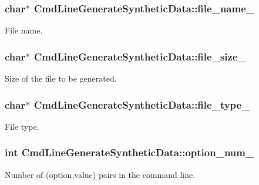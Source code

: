 \subsubsection[{file\+\_\+name\+\_\+}]{\setlength{\rightskip}{0pt plus 5cm}char$\ast$ Cmd\+Line\+Generate\+Synthetic\+Data\+::file\+\_\+name\+\_\+}\label{classCmdLineGenerateSyntheticData_a2c3b1ab6214ade821d8eabf55cbc5307}
File name. \hypertarget{classCmdLineGenerateSyntheticData_aa53289d7461a1a0122d609b80ee0ae04}{}
\subsubsection[{file\+\_\+size\+\_\+}]{\setlength{\rightskip}{0pt plus 5cm}char$\ast$ Cmd\+Line\+Generate\+Synthetic\+Data\+::file\+\_\+size\+\_\+}\label{classCmdLineGenerateSyntheticData_aa53289d7461a1a0122d609b80ee0ae04}
Size of the file to be generated. \hypertarget{classCmdLineGenerateSyntheticData_af3e3e257b1fc4f9ea433ca80aa8076c3}{}
\subsubsection[{file\+\_\+type\+\_\+}]{\setlength{\rightskip}{0pt plus 5cm}char$\ast$ Cmd\+Line\+Generate\+Synthetic\+Data\+::file\+\_\+type\+\_\+}\label{classCmdLineGenerateSyntheticData_af3e3e257b1fc4f9ea433ca80aa8076c3}
File type. \hypertarget{classCmdLineGenerateSyntheticData_a5178cd743052b7a9fa6f3eada0caef04}{}
\subsubsection[{option\+\_\+num\+\_\+}]{\setlength{\rightskip}{0pt plus 5cm}int Cmd\+Line\+Generate\+Synthetic\+Data\+::option\+\_\+num\+\_\+}\label{classCmdLineGenerateSyntheticData_a5178cd743052b7a9fa6f3eada0caef04}
Number of (option,value) pairs in the command line. \hypertarget{classCmdLineGenerateSyntheticData_ac19336308c1a0903967dd13fd231e7ab}{}
